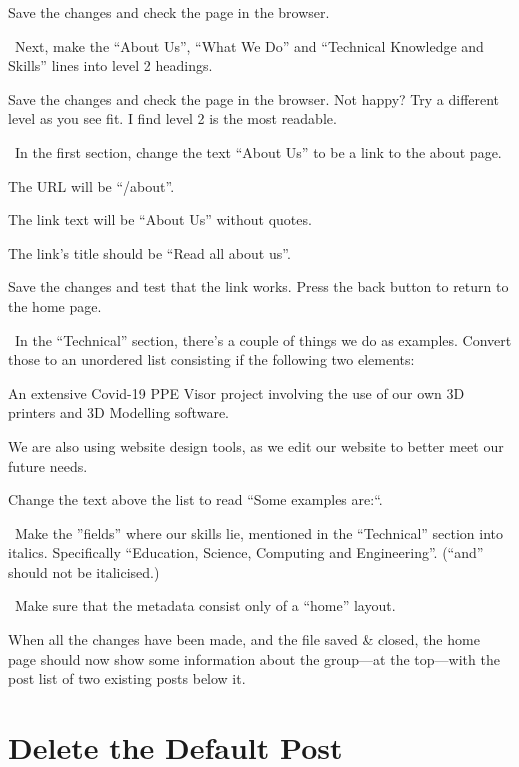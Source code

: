 Save the changes and check the page in the browser.

\lyxarrow{}~Next, make the ``About Us'', ``What We Do'' and ``Technical Knowledge and Skills'' lines into level 2 headings.

Save the changes and check the page in the browser. Not happy? Try a different level as you see fit. I find level 2 is the most readable.

\lyxarrow{}~In the first section, change the text ``About Us'' to be a link to the about page.

\hspace{\parindent}The URL will be ``/about''.

\hspace{\parindent}The link text will be ``About Us'' without quotes.

\hspace{\parindent}The link's title should be ``Read all about us''.

Save the changes and test that the link works. Press the back button to return to the home page.

\lyxarrow{}~In the ``Technical'' section, there's a couple of things we do as examples. Convert those to an unordered list consisting if the following two elements:

\hspace{\parindent}An extensive Covid-19 PPE Visor project involving the use of our own 3D printers and 3D Modelling software.

\hspace{\parindent}We are also using website design tools, as we edit our website to better meet our future needs.

\hspace{\parindent}Change the text above the list to read ``Some examples are:``.


\lyxarrow{}~Make the ''fields'' where our skills lie, mentioned in the ``Technical'' section into italics. Specifically ``Education, Science, Computing and Engineering''. (``and'' should not be italicised.)

\lyxarrow{}~Make sure that the metadata consist only of a ``home'' layout.

When all the changes have been made, and the file saved \& closed, the home page should now show some information about the group---at the top---with the post list of two existing posts below it.

\section{Delete the Default Post}

